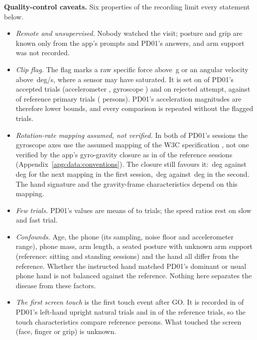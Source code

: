 \textbf{Quality-control caveats.}
Six properties of the recording limit every statement below.
\begin{itemize}[nosep]
  \item \emph{Remote and unsupervised.} Nobody watched the visit; posture and grip are known only from the app's prompts and PD01's answers, and arm support was not recorded.
  \item \emph{Clip flag.} The flag  marks a raw specific force above \,g or an angular velocity above \,deg/s, where a sensor may have saturated. It is set on  of PD01's  accepted trials (accelerometer , gyroscope ) and on  rejected attempt, against  of  reference primary trials ( persons). PD01's acceleration magnitudes are therefore lower bounds, and every comparison is repeated without the flagged trials.
  \item \emph{Rotation-rate mapping assumed, not verified.} In both of PD01's sessions the gyroscope axes use the assumed mapping of the W3C specification \cite{w3c2025deviceorientation}, not one verified by the app's gyro-gravity closure as in  of the  reference sessions (Appendix~\ref{app:data:conventions}). The closure still favours it: \,deg against \,deg for the next mapping in the first session, \,deg against \,deg in the second. The hand signature and the gravity-frame characteristics depend on this mapping.
  \item \emph{Few trials.} PD01's values are means of  to  trials; the speed ratios rest on  slow and  fast trial.
  \item \emph{Confounds.} Age, the phone (its sampling, noise floor and accelerometer range), phone mass, arm length, a seated posture with unknown arm support (reference:  sitting and  standing sessions) and the hand all differ from the reference. Whether the instructed hand matched PD01's dominant or usual phone hand is not balanced against the reference. Nothing here separates the disease from these factors.
  \item \emph{The first screen touch} is the first touch event after GO. It is recorded in  of PD01's left-hand upright natural trials and in  of the reference trials, so the touch characteristics compare  reference persons. What touched the screen (face, finger or grip) is unknown.
\end{itemize}

